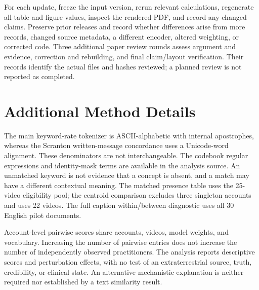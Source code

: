 For each update, freeze the input version, rerun relevant calculations, regenerate all table and figure values, inspect the rendered PDF, and record any changed claims. Preserve prior releases and record whether differences arise from more records, changed source metadata, a different encoder, altered weighting, or corrected code. Three additional paper review rounds assess argument and evidence, correction and rebuilding, and final claim/layout verification. Their records identify the actual files and hashes reviewed; a planned review is not reported as completed.

\section{Additional Method Details}
The main keyword-rate tokenizer is ASCII-alphabetic with internal apostrophes, whereas the Scranton written-message concordance uses a Unicode-word alignment. These denominators are not interchangeable. The codebook regular expressions and identity-mask terms are available in the analysis source. An unmatched keyword is not evidence that a concept is absent, and a match may have a different contextual meaning. The matched presence table uses the 25-video eligibility pool; the centroid comparison excludes three singleton accounts and uses 22 videos. The full caption within/between diagnostic uses all 30 English pilot documents.

Account-level pairwise scores share accounts, videos, model weights, and vocabulary. Increasing the number of pairwise entries does not increase the number of independently observed practitioners. The analysis reports descriptive scores and perturbation effects, with no test of an extraterrestrial source, truth, credibility, or clinical state. An alternative mechanistic explanation is neither required nor established by a text similarity result.
